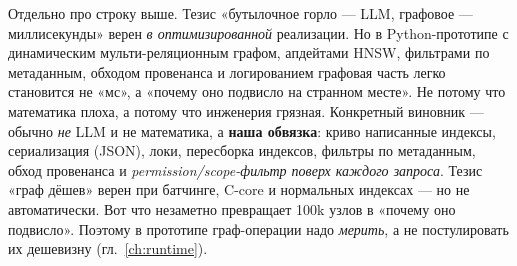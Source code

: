 \begin{pitfall}
Отдельно про строку выше. Тезис «бутылочное горло — LLM, графовое — миллисекунды»
верен \emph{в оптимизированной} реализации. Но в Python-прототипе с динамическим
мульти-реляционным графом, апдейтами HNSW, фильтрами по метаданным, обходом
провенанса и логированием графовая часть легко становится не «мс», а «почему оно
подвисло на странном месте». Не потому что математика плоха, а потому что инженерия
грязная. Конкретный виновник — обычно \emph{не} LLM и не математика, а \textbf{наша
обвязка}: криво написанные индексы, сериализация (JSON), локи, пересборка индексов,
фильтры по метаданным, обход провенанса и \emph{permission/scope-фильтр поверх каждого
запроса}. Тезис «граф дёшев» верен при батчинге, C-core и нормальных индексах — но не
автоматически. Вот что незаметно превращает 100k узлов в «почему оно подвисло». Поэтому
в прототипе граф-операции надо \emph{мерить}, а не постулировать их дешевизну
(гл.~\ref{ch:runtime}).
\end{pitfall}
